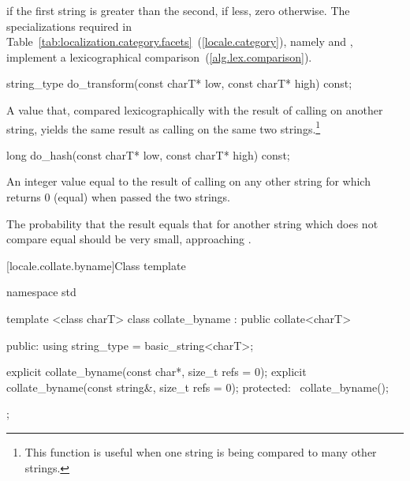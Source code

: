 \begin{itemdescr}
\pnum
\returns
{}
if the first string is greater than the second,
if less, zero otherwise.
The specializations required in Table~\ref{tab:localization.category.facets}~(\ref{locale.category}), namely
and
,
implement
a lexicographical comparison~(\ref{alg.lex.comparison}).
\end{itemdescr}

%
\begin{itemdecl}
string_type do_transform(const charT* low, const charT* high) const;
\end{itemdecl}

\begin{itemdescr}
\pnum
\returns
A
value that, compared lexicographically with the result of calling
on another string, yields the same result as calling
on the same two strings.\footnote{This function is useful when one string is
being compared to many other strings.}
\end{itemdescr}

%
\begin{itemdecl}
long do_hash(const charT* low, const charT* high) const;
\end{itemdecl}

\begin{itemdescr}
\pnum
\returns
An integer value equal to the result of calling
on any other string for which
returns 0 (equal) when passed the two strings.
\begin{note}
The probability that the result equals that for another string which does
not compare equal should be very small, approaching
.
\end{note}
\end{itemdescr}

[locale.collate.byname]{Class template }

%
\begin{codeblock}
namespace std {
  template <class charT>
  class collate_byname : public collate<charT> {
  public:
    using string_type = basic_string<charT>;

    explicit collate_byname(const char*, size_t refs = 0);
    explicit collate_byname(const string&, size_t refs = 0);
  protected:
    ~collate_byname();
  };
}
\end{codeblock}

